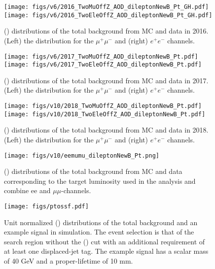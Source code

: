 \begin{figure}[h!]
  \caption{\pt(\dilepton) distributions of the total background from MC and data in 2016.
  (Left) the distribution for the $\mu^+\mu^-$ and (right) $e^+e^-$ channels.}
  \label{fig:zpt}
  \centering
  \texttt{[image: figs/v6/2016\_TwoMuOffZ\_AOD\_dileptonNewB\_Pt\_GH.pdf]}
  \texttt{[image: figs/v6/2016\_TwoEleOffZ\_AOD\_dileptonNewB\_Pt\_GH.pdf]}
\end{figure}
\begin{figure}[h!]
  \caption{\pt(\dilepton) distributions of the total background from MC and data in 2017.
  (Left) the distribution for the $\mu^+\mu^-$ and (right) $e^+e^-$ channels.}
  \label{fig:zpt2017}
  \centering
  \texttt{[image: figs/v6/2017\_TwoMuOffZ\_AOD\_dileptonNewB\_Pt.pdf]}
  \texttt{[image: figs/v6/2017\_TwoEleOffZ\_AOD\_dileptonNewB\_Pt.pdf]}
\end{figure}
\begin{figure}[h!]
  \caption{\pt(\dilepton) distributions of the total background from MC and data in 2018.
  (Left) the distribution for the $\mu^+\mu^-$ and (right) $e^+e^-$ channels.}
  \label{fig:zpt2}
  \centering
  \texttt{[image: figs/v10/2018\_TwoMuOffZ\_AOD\_dileptonNewB\_Pt.pdf]}
  \texttt{[image: figs/v10/2018\_TwoEleOffZ\_AOD\_dileptonNewB\_Pt.pdf]}
\end{figure}
\begin{figure}[h!]
  \caption{\pt(\dilepton) distributions of the total background from MC and data corresponding to the target
  luminosity used in the analysis and combine ee and $\mu\mu$-channels. }
  \label{fig:zpt2}
  \centering
  \texttt{[image: figs/v10/eemumu\_dileptonNewB\_Pt.png]}
\end{figure}



\begin{figure}[h!]
  \caption{Unit normalized \pt(\dilepton) distributions of the total background and an example signal in simulation.
    The event selection is that of the \twomuzh search region without the  \pt(\dilepton) cut
    with an additional requirement of at least one displaced-jet tag.
    The example signal has a scalar mass of 40 GeV and a proper-lifetime of 10 mm.
  }
  \label{fig:ptossf}
  \centering
  \texttt{[image: figs/ptossf.pdf]}
\end{figure}


